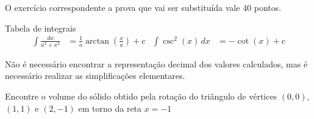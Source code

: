 \documentclass[a4paper,12pt,fleqn]{article}
\begin{document}

O exercício correspondente a prova que vai ser substituída vale 40 pontos.

\vspace{\baselineskip}
Tabela de integrais
\begin{align*}
  \int \frac{dx}{a^2+x^2} & = \frac{1}{a}\arctan\left(\frac{x}{a}\right) + c &
  \int \csc^2(x) \, dx & = -\cot(x) + c
\end{align*}

Não é necessário encontrar a representação decimal dos valores calculados,
mas é necessário realizar as simplificações elementares.

Encontre o volume do sólido obtido pela rotação do triângulo de vértices
\((0, 0)\), \((1, 1)\) e \((2, -1)\) em torno da reta \(x=-1\)
\end{document}
